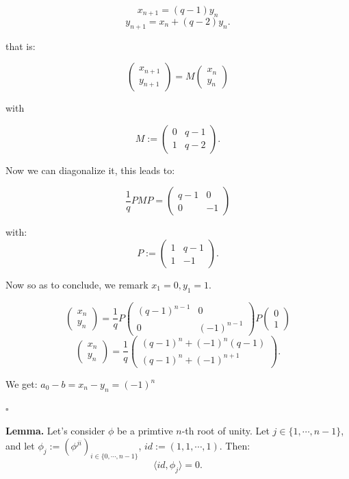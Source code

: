 \documentclass{article}
\begin{document}
\[
x_{n+1} = (q-1) y_n
\]
\[
y_{n+1} = x_n + (q-2) y_n.
\]

that is: 

\[
\begin{pmatrix}x_{n+1} \\ y_{n+1}\end{pmatrix} = M \begin{pmatrix}x_{n} \\ y_{n}\end{pmatrix}
\]


with

\[
M:=\begin{pmatrix}0 & q-1 \\1 & q-2\end{pmatrix}.
\]

Now we can diagonalize it, this leads to:

\[
\frac{1}{q}PMP=\begin{pmatrix}q-1 & 0 \\0 & -1\end{pmatrix}
\]

with:
\[
P:=\begin{pmatrix} 1&q-1\\1&-1 \end{pmatrix}.
\]

Now so as to conclude, we remark $x_1 = 0, y_1=1$.

\[
\begin{pmatrix}x_{n} \\ y_{n}\end{pmatrix} = \frac{1}{q}P\begin{pmatrix}(q-1)^{n-1} & 0 \\0 & (-1)^{n-1}\end{pmatrix} P \begin{pmatrix}0 \\ 1\end{pmatrix}
\]
\[
\begin{pmatrix}x_{n} \\ y_{n}\end{pmatrix} = \frac{1}{q}\begin{pmatrix}(q-1)^n + (-1)^n(q-1) \\ (q-1)^n + (-1)^{n+1}\end{pmatrix}.
\]

We get: $a_0-b = x_n - y_n =(-1)^n$

\hfill $\square$

\textbf{Lemma.} Let's consider $\phi$ be a primtive $n$-th root of unity.
Let $j \in \{1,\cdots, n-1\}$, and let $\phi_j := (\phi^{ji})_{i \in \{0,\cdots,n-1\}}$, $id := (1,1,\cdots,1)$. Then:
\[
\langle id, \phi_j \rangle = 0.
\]
\end{document}
